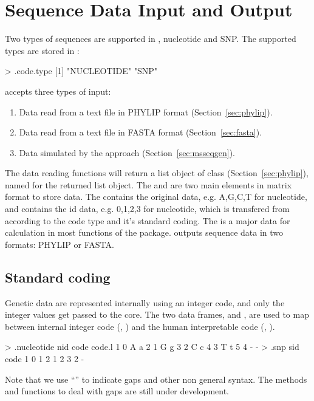 \section[Sequence Data Input and Output]{Sequence Data Input and Output}
\label{sec:dataio}

Two types of sequences are supported in ,
nucleotide and SNP. The supported types are stored in :
\begin{Code}
> .code.type
[1] "NUCLEOTIDE" "SNP" 
\end{Code}
 accepts three types of input:
\begin{enumerate}
\item
Data read from a text file in PHYLIP format (Section~\ref{sec:phylip}).
\item
Data read from a text file in FASTA format (Section~\ref{sec:fasta}).
\item
Data simulated by the  approach (Section~\ref{sec:msseqgen}).
\end{enumerate}
The data reading functions  will return a list object of 
class {\color{red} } (Section~\ref{sec:phylip}),
named  for the returned list object.
The  and  are two main elements in matrix
format to store data.
The  contains the original data, e.g. A,G,C,T for
nucleotide, and
 contains the id data, e.g. 0,1,2,3 for nucleotide,
which is transfered from 
according to the code type and it's standard coding.
The  is a major data for calculation in most functions
of the  package.
 outputs sequence data in two formats:
PHYLIP or FASTA.





\subsection[Standard coding]{Standard coding}
\label{sec:coding}

Genetic data are represented internally using an integer code, and only the integer values get passed to the  core.
The two data frames,  and ,
are used to map between internal integer code (, ) and the human interpretable code (, ).
\begin{Code}
> .nucleotide
  nid code code.l
1   0    A      a
2   1    G      g
3   2    C      c
4   3    T      t
5   4    -      -
> .snp
  sid code
1   0    1
2   1    2
3   2    -
\end{Code}
Note that we use ``\code{-}'' to indicate gaps and other non general syntax.
The methods and functions to deal with gaps are still under development.


